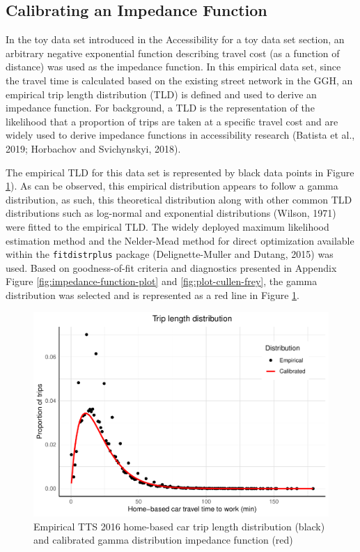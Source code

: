 \documentclass[]{elsarticle} %
\begin{document}
\hypertarget{calibrating-an-impedance-function}{%
\subsection{Calibrating an Impedance
Function}\label{calibrating-an-impedance-function}}

In the toy data set introduced in the
\protect\hypertarget{accessibility-numerical-example}{}{Accessibility
for a toy data set} section, an arbitrary negative exponential function
describing travel cost (as a function of distance) was used as the
impedance function. In this empirical data set, since the travel time is
calculated based on the existing street network in the GGH, an empirical
trip length distribution (TLD) is defined and used to derive an
impedance function. For background, a TLD is the representation of the
likelihood that a proportion of trips are taken at a specific travel
cost and are widely used to derive impedance functions in accessibility
research (Batista et al., 2019; Horbachov and Svichynskyi, 2018).

The empirical TLD for this data set is represented by black data points
in Figure \ref{fig:TLD-Gamma-plot}). As can be observed, this empirical
distribution appears to follow a gamma distribution, as such, this
theoretical distribution along with other common TLD distributions such
as log-normal and exponential distributions (Wilson, 1971) were fitted
to the empirical TLD. The widely deployed maximum likelihood estimation
method and the Nelder-Mead method for direct optimization available
within the \texttt{fitdistrplus} package (Delignette-Muller and Dutang,
2015) was used. Based on goodness-of-fit criteria and diagnostics
presented in Appendix Figure \ref{fig:impedance-function-plot} and
\ref{fig:plot-cullen-frey}, the gamma distribution was selected and is
represented as a red line in Figure \ref{fig:TLD-Gamma-plot}.

\begin{figure}
\includegraphics[width=1\linewidth]{Spatial-Availability_files/figure-latex/TLD-Gamma-plot-1} \caption{\label{fig:TLD-Gamma-plot}Empirical TTS 2016 home-based car trip length distribution (black) and calibrated gamma distribution impedance function (red)}\label{fig:TLD-Gamma-plot}
\end{figure}
\end{document}

